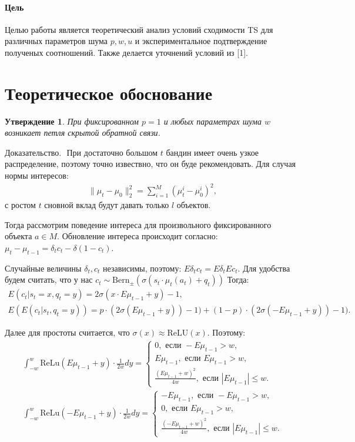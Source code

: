 \documentclass[12pt, twoside]{article}
\newtheorem{statement}{Утверждение}
\begin{document}
\paragraph{Цель}
Целью работы является теоретический анализ условий сходимости TS для различных параметров шума $p, w, u$ и экспериментальное подтверждение полученых соотношений. 
Также делается уточнений условий из [1]. 

\section{Теоретическое обоснование}
\begin{statement}
    При фиксированном $ p = 1$ и любых параметрах шума $w$ возникает петля скрытой обратной связи. 
\end{statement}
$\textbf{Доказательство. }$ При достаточно большом $t$ бандин имеет очень узкое распределение, поэтому точно извествно, что он буде рекомендовать.
Для случая нормы интересов: 
\begin{gather*}
  \|\mu_t - \mu_0 \|^2_2 = \sum_{i=1}^M (\mu_t^i - \mu_0^i)^2,
\end{gather*}
с ростом $t$ сновной вклад будут давать только $l$ объектов.

Тогда рассмотрим поведение интереса для произвольного фиксированного объекта $a \in M$. 
Обновление интереса происходит согласно: $\mu_t - \mu_{t-1} = \delta_t c_t - \delta (1 - c_t)$.

Случайные величины $\delta_t, c_t$ независимы, поэтому: $E \delta_t c_t = E \delta_t E c_t$. 
Для удобства будем считать, что у нас $c_t \sim \text{Bern}_{\pm}(\sigma(s_t \cdot \mu_t(a_t) + q_t))$
Тогда: 
\begin{gather*}
  E (c_t | s_t = x, q_t = y) = 2 \sigma(x \cdot E \mu_{t-1} + y) - 1, \\
  E (E (c_t | s_t, q_t = y)) = p \cdot (2 \sigma(E \mu_{t-1} + y)) - 1) +  (1-p) \cdot (2 \sigma(- E\mu_{t-1} + y)) - 1).  
\end{gather*}

Далее для простоты считается, что $\sigma(x) \approx \text{ReLU}(x)$.
Поэтому: 
\begin{gather*}
  \int_{-w}^w \text{ReLu}(E\mu_{t-1} + y) \cdot \frac{1}{2 w} dy =  
    \begin{cases} 
      0, \text{ если } -E\mu_{t-1} > w, \\
      E\mu_{t-1}, \text{ если } E\mu_{t-1} > w, \\
      \frac{(E\mu_{t-1} + w)^2}{4 w}, \text{ если } |E\mu_{t-1}| \leq w.
    \end{cases} \\ 
  \int_{-w}^w \text{ReLu}(-E\mu_{t-1} + y) \cdot \frac{1}{2 w} dy =  
    \begin{cases} 
      -E\mu_{t-1}, \text{ если } -E\mu_{t-1} > w, \\
      0, \text{ если } E\mu_{t-1} > w, \\
      \frac{(-E\mu_{t-1} + w)^2}{4 w}, \text{ если } |E\mu_{t-1}| \leq w.
    \end{cases} 
\end{gather*}
\end{document}

